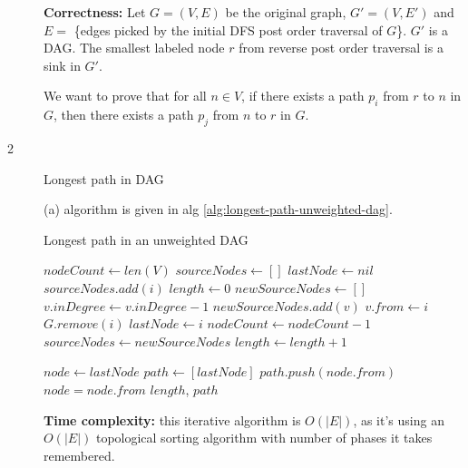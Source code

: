 \documentclass{article}
\begin{document}
\begin{description}
  \textbf{Correctness:} Let $G=(V,E)$ be the original graph, $G'=(V,E')$ and $E=$ \{edges picked by the initial DFS post order traversal of $G$\}. $G'$ is a DAG. The smallest labeled node $r$ from reverse post order traversal is a sink in $G'$. 

  We want to prove that for all $n \in V$, if there exists a path $p_i$ from $r$ to $n$ in $G$, then there exists a path $p_j$ from $n$ to $r$ in $G$. 



\item[2]{Longest path in DAG}

  (a) algorithm is given in alg \ref{alg:longest-path-unweighted-dag}.

  \begin{algorithm}[h]
  \caption{Longest path in an unweighted DAG}
  \label{alg:longest-path-unweighted-dag}
    \begin{algorithmic}[1]
  
      \State $nodeCount \gets len(V)$
      \State $sourceNodes \gets []$
      \State $lastNode \gets nil$
          \State $sourceNodes.add(i)$
        \EndIf
      \EndFor
      \State $length \gets 0$
        \State $newSourceNodes \gets []$
            \State $v.inDegree \gets v.inDegree - 1$
              \State $newSourceNodes.add(v)$
              \State $v.from \gets i$
            \EndIf
          \EndFor
          \State $G.remove(i)$
          \State $lastNode \gets i$
          \State $nodeCount \gets nodeCount - 1$
        \EndFor
        \State $sourceNodes \gets newSourceNodes$
        \State $length \gets length + 1$
      \EndWhile

      \State $node \gets lastNode$
      \State $path \gets [lastNode]$
        \State $path.push(node.from)$
        \State $node = node.from$
      \EndWhile
      \State \Return $length$, $path$
    \EndFunction
    
    \end{algorithmic}
  \end{algorithm}

  \textbf{Time complexity:} this iterative algorithm is $O(|E|)$, as it's using an $O(|E|)$ topological sorting algorithm with number of phases it takes remembered. 


\end{description}
\end{document}
